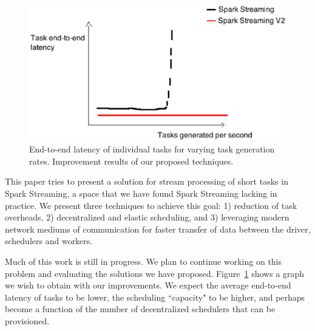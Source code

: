 \noindent

\begin{figure}[t!]
  \begin{center}
\includegraphics[scale=0.4]{images_graphs/money_graph.eps}
  \end{center}
  \caption{End-to-end latency of individual tasks for varying task generation rates. Improvement results of our proposed techniques.}
  \label{fig:money_graph}
\end{figure}

This paper tries to present a solution for stream processing of short tasks in Spark Streaming, a space that we have found Spark Streaming lacking in practice.
We present three techniques to achieve this goal: 1) reduction of task overheads, 2) decentralized and elastic scheduling, and 3) leveraging modern network mediums of communication for faster transfer of data between the driver, schedulers and workers.

Much of this work is still in progress. We plan to continue working on this problem and evaluating the solutions we have proposed. Figure~\ref{fig:money_graph} shows a graph we wish to obtain with our improvements. We expect the average end-to-end latency of tasks to be lower, the scheduling ``capacity" to be higher, and perhaps become a function of the number of decentralized schedulers that can be provisioned.
